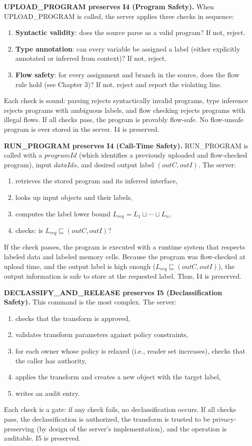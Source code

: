 \textbf{UPLOAD\_PROGRAM preserves I4 (Program Safety).} When UPLOAD\_PROGRAM is called, the server applies three checks in sequence:
\begin{enumerate}
    \item \textbf{Syntactic validity}: does the source parse as a valid program? If not, reject.
    \item \textbf{Type annotation}: can every variable be assigned a label (either explicitly annotated or inferred from context)? If not, reject.
    \item \textbf{Flow safety}: for every assignment and branch in the source, does the flow rule hold (see Chapter 3)? If not, reject and report the violating line.
\end{enumerate}
Each check is sound: parsing rejects syntactically invalid programs, type inference rejects programs with ambiguous labels, and flow checking rejects programs with illegal flows. If all checks pass, the program is provably flow-safe. No flow-unsafe program is ever stored in the server. I4 is preserved.

\textbf{RUN\_PROGRAM preserves I4 (Call-Time Safety).} RUN\_PROGRAM is called with a $programId$ (which identifies a previously uploaded and flow-checked program), input $dataIds$, and desired output label $(outC, outI)$. The server:
\begin{enumerate}
    \item retrieves the stored program and its inferred interface,
    \item looks up input objects and their labels,
    \item computes the label lower bound $L_{req} = L_1 \sqcup \cdots \sqcup L_n$,
    \item checks: is $L_{req} \sqsubseteq (outC, outI)$?
\end{enumerate}
If the check passes, the program is executed with a runtime system that respects labeled data and labeled memory cells. Because the program was flow-checked at upload time, and the output label is high enough ($L_{req} \sqsubseteq (outC, outI)$), the output information is safe to store at the requested label. Thus, I4 is preserved.

\textbf{DECLASSIFY\_AND\_RELEASE preserves I5 (Declassification Safety).} This command is the most complex. The server:
\begin{enumerate}
    \item checks that the transform is approved,
    \item validates transform parameters against policy constraints,
    \item for each owner whose policy is relaxed (i.e., reader set increases), checks that the caller has authority,
    \item applies the transform and creates a new object with the target label,
    \item writes an audit entry.
\end{enumerate}
Each check is a gate: if any check fails, no declassification occurs. If all checks pass, the declassification is authorized, the transform is trusted to be privacy-preserving (by design of the server's implementation), and the operation is auditable. I5 is preserved.

